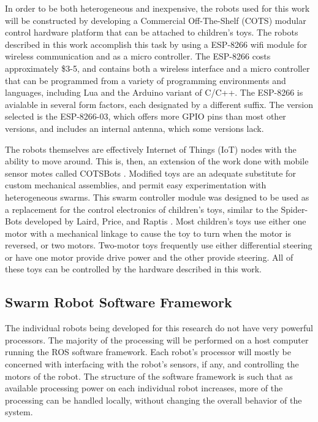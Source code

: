\documentclass[]{article}
\begin{document}
In order to be both heterogeneous and inexpensive, the robots used for this work will be constructed by developing a Commercial Off-The-Shelf (COTS) modular control hardware platform that can be attached to children's toys. 
The robots described in this work accomplish this task by using a ESP-8266 wifi module for wireless communication and as a micro controller. 
The ESP-8266 costs approximately \$3-5, and contains both a wireless interface and a micro controller that can be programmed from a variety of programming environments and languages, including Lua and the Arduino variant of C/C++.   
The ESP-8266 is avialable in several form factors, each designated by a different suffix. 
The version selected is the ESP-8266-03, which offers more GPIO pins than most other versions, and includes an internal antenna, which some versions lack. 

The robots themselves are effectively Internet of Things (IoT) nodes with the ability to move around. 
This is, then, an extension of the work done with mobile sensor motes called COTSBots \cite{bergbreiter2003cotsbots}.
Modified toys are an adequate substitute for custom mechanical assemblies, and permit easy experimentation with heterogeneous swarms. 
This swarm controller module was designed to be used as a replacement for the control electronics of children's toys, similar to the Spider-Bots developed by Laird, Price, and Raptis \cite{lairdspider}. 
Most children's toys use either one motor with a mechanical linkage to cause the toy to turn when the motor is reversed, or two motors.
Two-motor toys frequently use either differential steering or have one motor provide drive power and the other provide steering. 
All of these toys can be controlled by the hardware described in this work. 

\subsection{Swarm Robot Software Framework}

The individual robots being developed for this research do not have very powerful processors. 
The majority of the processing will be performed on a host computer running the ROS software framework. 
Each robot's processor will mostly be concerned with interfacing with the robot's sensors, if any, and controlling the motors of the robot. 
The structure of the software framework is such that as available processing power on each individual robot increases, more of the processing can be handled locally, without changing the overall behavior of the system.
\end{document}
